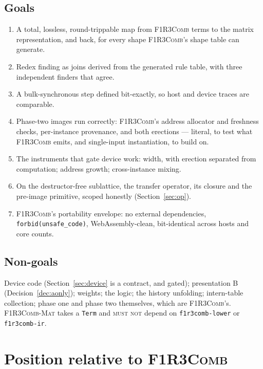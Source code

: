 \documentclass[11pt,a4paper]{article}
\newcommand{\code}[1]{\texttt{#1}}
\newcommand{\Comb}{\textsc{F1R3Comb}}
\newcommand{\Mat}{\textsc{F1R3Comb-Mat}}
\newcommand{\MUSTNOT}{\textsc{must not}}
\theoremstyle{definition}
\theoremstyle{plain}
\begin{document}
\subsection{Goals}

\begin{enumerate}[leftmargin=1.6em]
\item A total, lossless, round-trippable map from \Comb{} terms to the matrix
representation, and back, for every shape \Comb's shape table can generate.
\item Redex finding as joins derived from the generated rule table, with three
independent finders that agree.
\item A bulk-synchronous step defined bit-exactly, so host and device traces
are comparable.
\item Phase-two images run correctly: \Comb's address allocator and freshness
checks, per-instance provenance, and both erections --- literal, to test what
\Comb{} emits, and single-input instantiation, to build on.
\item The instruments that gate device work: width, with erection separated
from computation; address growth; cross-instance mixing.
\item On the destructor-free sublattice, the transfer operator, its closure
and the pre-image primitive, scoped honestly (Section~\ref{sec:op}).
\item \Comb's portability envelope: no external dependencies,
\code{forbid(unsafe\_code)}, WebAssembly-clean, bit-identical across hosts
and core counts.
\end{enumerate}

\subsection{Non-goals}\label{sec:nongoals}

Device code (Section~\ref{sec:device} is a contract, and gated); presentation
B (Decision~\ref{dec:aonly}); weights; the logic; the history unfolding;
intern-table collection; phase one and phase two themselves, which are
\Comb's. \Mat{} takes a \code{Term} and \MUSTNOT{} depend on
\code{f1r3comb-lower} or \code{f1r3comb-ir}.

\section{Position relative to \Comb}\label{sec:position}
\end{document}
